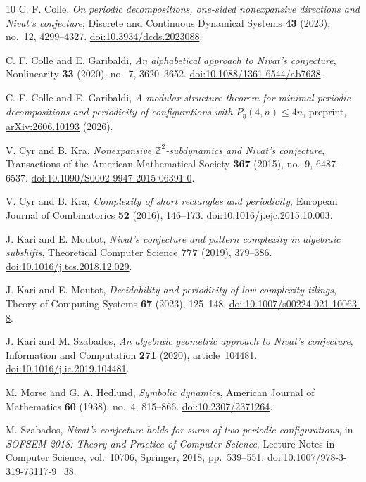 \documentclass[11pt]{article}
\numberwithin{equation}{section}
\theoremstyle{definition}
\theoremstyle{remark}
\newcommand{\Z}{\mathbb Z}
\begin{document}
\begingroup
\raggedright
\begin{thebibliography}{10}
C. F. Colle,
\emph{On periodic decompositions, one-sided nonexpansive directions and Nivat's conjecture},
Discrete and Continuous Dynamical Systems \textbf{43} (2023), no.~12, 4299--4327.
\href{https://doi.org/10.3934/dcds.2023088}{doi:10.3934/dcds.2023088}.

C. F. Colle and E. Garibaldi,
\emph{An alphabetical approach to Nivat's conjecture},
Nonlinearity \textbf{33} (2020), no.~7, 3620--3652.
\href{https://doi.org/10.1088/1361-6544/ab7638}{doi:10.1088/1361-6544/ab7638}.

C. F. Colle and E. Garibaldi,
\emph{A modular structure theorem for minimal periodic decompositions and periodicity of
configurations with $P_\eta(4,n)\le4n$},
preprint, \href{https://arxiv.org/abs/2606.10193}{arXiv:2606.10193} (2026).

V. Cyr and B. Kra,
\emph{Nonexpansive $\Z^2$-subdynamics and Nivat's conjecture},
Transactions of the American Mathematical Society \textbf{367} (2015), no.~9, 6487--6537.
\href{https://doi.org/10.1090/S0002-9947-2015-06391-0}{doi:10.1090/S0002-9947-2015-06391-0}.

V. Cyr and B. Kra,
\emph{Complexity of short rectangles and periodicity},
European Journal of Combinatorics \textbf{52} (2016), 146--173.
\href{https://doi.org/10.1016/j.ejc.2015.10.003}{doi:10.1016/j.ejc.2015.10.003}.

J. Kari and E. Moutot,
\emph{Nivat's conjecture and pattern complexity in algebraic subshifts},
Theoretical Computer Science \textbf{777} (2019), 379--386.
\href{https://doi.org/10.1016/j.tcs.2018.12.029}{doi:10.1016/j.tcs.2018.12.029}.

J. Kari and E. Moutot,
\emph{Decidability and periodicity of low complexity tilings},
Theory of Computing Systems \textbf{67} (2023), 125--148.
\href{https://doi.org/10.1007/s00224-021-10063-8}{doi:10.1007/s00224-021-10063-8}.

J. Kari and M. Szabados,
\emph{An algebraic geometric approach to Nivat's conjecture},
Information and Computation \textbf{271} (2020), article~104481.
\href{https://doi.org/10.1016/j.ic.2019.104481}{doi:10.1016/j.ic.2019.104481}.

M. Morse and G. A. Hedlund,
\emph{Symbolic dynamics},
American Journal of Mathematics \textbf{60} (1938), no.~4, 815--866.
\href{https://doi.org/10.2307/2371264}{doi:10.2307/2371264}.

M. Szabados,
\emph{Nivat's conjecture holds for sums of two periodic configurations},
in \emph{SOFSEM 2018: Theory and Practice of Computer Science},
Lecture Notes in Computer Science, vol.~10706, Springer, 2018, pp.~539--551.
\href{https://doi.org/10.1007/978-3-319-73117-9_38}{doi:10.1007/978-3-319-73117-9\_38}.
\end{thebibliography}
\endgroup
\end{document}
